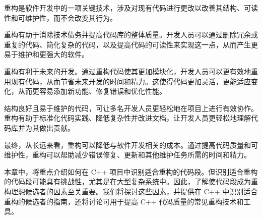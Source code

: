 重构是软件开发中的一项关键技术，涉及对现有代码进行更改以改善其结构、可读性和可维护性，而不会改变其行为。

重构有助于消除技术债务并提高代码库的整体质量。开发人员可以通过删除冗余或重复的代码、简化复杂的代码，以及提高代码的可读性来实现这一点，从而产生更易于维护和更强大的软件。

重构有利于未来的开发。通过重构代码使其更加模块化，开发人员可以更有效地重用现有代码，从而节省未来开发的时间和精力。这使得代码更加灵活，更能适应变化，从而更容易添加新功能、修复错误和优化性能。

结构良好且易于维护的代码，可让多名开发人员更轻松地在项目上进行有效协作。重构有助于标准化代码实践、降低复杂性并改进文档，让开发人员更轻松地理解代码库并为其做出贡献。

最终，从长远来看，重构可以降低与软件开发相关的成本。通过提高代码质量和可维护性，重构可以帮助减少错误修复、更新和其他维护任务所需的时间和精力。

本章中，将重点介绍如何在 C++ 项目中识别适合重构的代码段。但识别适合重构的代码段可能具有挑战性，尤其是在大型复杂系统中。因此，了解使代码段成为重构理想候选者的因素至关重要。我们将探讨这些因素，并提供在 C++ 中识别适合重构的候选者的指南，还将讨论可用于提高 C++ 代码质量的常见重构技术和工具。
